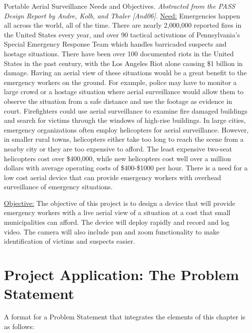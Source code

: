 \begin{example}{Portable Aerial Surveillance Needs and Objectives.
\emph{Abstracted from the PASS Design Report by Andre, Kolb, and Thaler
{[}And06{]}. }}
\label{example:aerialSurveillanceNeeds}
\ul{Need:} Emergencies happen all across the world, all of the time.
There are nearly 2,000,000 reported fires in the United States every
year, and over 90 tactical activations of Pennsylvania's Special
Emergency Response Team which handles barricaded suspects and hostage
situations. There have been over 100 documented riots in the United
States in the past century, with the Los Angeles Riot alone causing \$1
billion in damage. Having an aerial view of these situations would be a
great benefit to the emergency workers on the ground. For example,
police may have to monitor a large crowd or a hostage situation where
aerial surveillance would allow them to observe the situation from a
safe distance and use the footage as evidence in court. Firefighters
could use aerial surveillance to examine fire damaged buildings and
search for victims through the windows of high-rise buildings. In large
cities, emergency organizations often employ helicopters for aerial
surveillance. However, in smaller rural towns, helicopters either take
too long to reach the scene from a nearby city or they are too expensive
to afford. The least expensive two-seat helicopters cost over \$400,000,
while new helicopters cost well over a million dollars with average
operating costs of \$400-\$1000 per hour. There is a need for a low cost
aerial device that can provide emergency workers with overhead
surveillance of emergency situations.

\ul{Objective:} The objective of this project is to design a device that
will provide emergency workers with a live aerial view of a situation at
a cost that small municipalities can afford. The device will deploy
rapidly and record and log video. The camera will also include pan and
zoom functionality to make identification of victims and suspects
easier.
\end{example}

\section{Project Application: The Problem Statement}
\label{section:project-application-the-problem-statement}

A format for a Problem Statement that integrates the elements of this
chapter is as follows:

